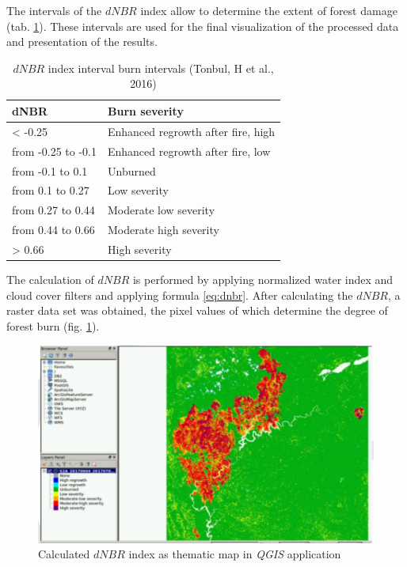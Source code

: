 	The intervals of the $dNBR$ index allow to determine the extent of forest damage (tab. \ref{tab:nbi-res}). These intervals are used for the final visualization of the processed data and presentation of the results.
	
	
	{\setlength{\extrarowheight}{15pt}%
	\begin{table}[H]
		\begin{center}
			\caption{$dNBR$ index interval burn intervals (Tonbul, H et al., 2016)}
			\label{tab:nbi-res}
			\begin{tabularx}{\textwidth}{|X|X|}
				\hline
				\textbf{dNBR} & \textbf{Burn severity}\\
				\hline
				< -0.25 & Enhanced regrowth after fire, high \\
				\hline
				from -0.25 to -0.1 & Enhanced regrowth after fire, low  \\
				\hline
				from -0.1 to 0.1 & Unburned \\
				\hline
				from 0.1 to 0.27 & Low severity \\
				\hline
				from 0.27 to 0.44 & Moderate low severity \\
				\hline
				from 0.44 to 0.66 & Moderate high severity \\
				\hline
				> 0.66 & High severity \\
				\hline
			\end{tabularx}
		\end{center}
	\end{table}

	The calculation of $dNBR$ is performed by applying normalized water index and cloud cover filters and applying formula \ref{eq:dnbr}. After calculating the $dNBR$, a raster data set was obtained, the pixel values of which determine the degree of forest burn (fig. \ref{fig:dnbr}).
	
	\begin{figure}[H]
		\centering
		\includegraphics[width=0.9\linewidth]{images/dnbr.png}
		\caption{Calculated $dNBR$ index as thematic map in \textit{QGIS} application}
		\label{fig:dnbr}
	\end{figure}

}
